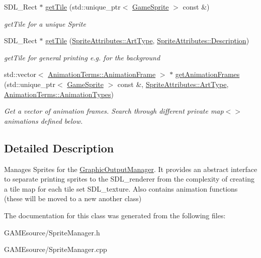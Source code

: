 \begin{DoxyCompactItemize}
S\+D\+L\+\_\+\+Rect $\ast$ \mbox{\hyperlink{class_sprite_manager_af89d1ca81d4ae6126e7916947bee84b7}{get\+Tile}} (std\+::unique\+\_\+ptr$<$ \mbox{\hyperlink{class_game_sprite}{Game\+Sprite}} $>$ const \&)
\begin{DoxyCompactList}\small\item\em get\+Tile for a unique Sprite \end{DoxyCompactList}\item 
\mbox{\label{class_sprite_manager_a85d576c3402f6b0addf81a7f427916b0}} 
S\+D\+L\+\_\+\+Rect $\ast$ \mbox{\hyperlink{class_sprite_manager_a85d576c3402f6b0addf81a7f427916b0}{get\+Tile}} (\mbox{\hyperlink{namespace_sprite_attributes_afb5447c311bc29f0ce8ddfd025c6e998}{Sprite\+Attributes\+::\+Art\+Type}}, \mbox{\hyperlink{namespace_sprite_attributes_a3ece96d6288b14d53d84e2138392395c}{Sprite\+Attributes\+::\+Description}})
\begin{DoxyCompactList}\small\item\em get\+Tile for general printing e.\+g. for the background \end{DoxyCompactList}\item 
\mbox{\label{class_sprite_manager_a697b1771c1a80333d9edc8c6fb6eb9bd}} 
std\+::vector$<$ \mbox{\hyperlink{namespace_animation_terms_a9ad8fa379228f750219207c3c9f618e5}{Animation\+Terms\+::\+Animation\+Frame}} $>$ $\ast$ \mbox{\hyperlink{class_sprite_manager_a697b1771c1a80333d9edc8c6fb6eb9bd}{get\+Animation\+Frames}} (std\+::unique\+\_\+ptr$<$ \mbox{\hyperlink{class_game_sprite}{Game\+Sprite}} $>$ const \&, \mbox{\hyperlink{namespace_sprite_attributes_afb5447c311bc29f0ce8ddfd025c6e998}{Sprite\+Attributes\+::\+Art\+Type}}, \mbox{\hyperlink{namespace_animation_terms_a171348588b2b248e71955ad7c5042e67}{Animation\+Terms\+::\+Animation\+Types}})
\begin{DoxyCompactList}\small\item\em Get a vector of animation frames. Search through different private map$<$$>$animations defined below. \end{DoxyCompactList}\end{DoxyCompactItemize}


\subsection{Detailed Description}
Manages Sprites for the \mbox{\hyperlink{class_graphic_output_manager}{Graphic\+Output\+Manager}}. It provides an abstract interface to separate printing sprites to the S\+D\+L\+\_\+renderer from the complexity of creating a tile map for each tile set S\+D\+L\+\_\+texture. Also contains animation functions (these will be moved to a new another class) 

The documentation for this class was generated from the following files\+:\begin{DoxyCompactItemize}
\item 
G\+A\+M\+Esource/Sprite\+Manager.\+h\item 
G\+A\+M\+Esource/Sprite\+Manager.\+cpp\end{DoxyCompactItemize}
